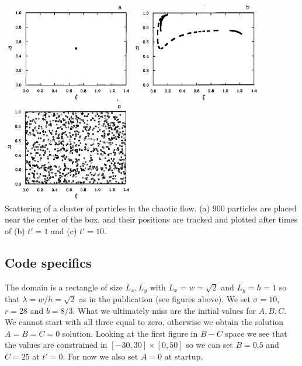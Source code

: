 \begin{center}
\includegraphics[width=5.7cm]{python_codes/fieldstone_156/images/ketu90e}
\includegraphics[width=5.7cm]{python_codes/fieldstone_156/images/ketu90f}
\includegraphics[width=5.7cm]{python_codes/fieldstone_156/images/ketu90g}\\
{
Scattering of a cluster of particles in the chaotic flow.
(a) 900 particles are placed near the center of the box, 
and their positions are tracked and plotted after times 
of (b) $t'=1$ and (c) $t'=10$.
}
\end{center}

\subsection*{Code specifics}


The domain is a rectangle of size $L_x,L_y$ with $L_x=w=\sqrt 2$ and $L_y=h=1$
so that $\lambda=w/h=\sqrt 2$ as in the publication (see figures above).
We set $\sigma=10$, $r=28$ and $b=8/3$. 
What we ultimately miss are the initial values for $A,B,C$. We cannot start
with all three equal to zero, otherwise we obtain the solution $A=B=C=0$ solution.
Looking at the first figure in $B-C$ space we see that the values are constrained in 
$[-30,30]\times[0,50]$ so we can set $B=0.5$ and $C=25$ at $t'=0$. 
For now we also set $A=0$ at startup. 



